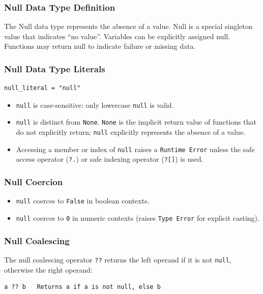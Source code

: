 \subsubsection{Null Data Type Definition}
The Null data type represents the absence of a value. Null is a special singleton value that indicates ``no value''. Variables can be explicitly assigned null. Functions may return null to indicate failure or missing data.

\subsubsection{Null Data Type Literals}
\begin{verbatim}
null_literal = "null"
\end{verbatim}

\begin{itemize}
\item \texttt{null} is case-sensitive: only lowercase \texttt{null} is valid.
\item \texttt{null} is distinct from \texttt{None}. \texttt{None} is the implicit return value of functions that do not explicitly return; \texttt{null} explicitly represents the absence of a value.
\item Accessing a member or index of \texttt{null} raises a \texttt{Runtime Error} unless the safe access operator (\texttt{?.}) or safe indexing operator (\texttt{?[]}) is used.
\end{itemize}

\subsubsection{Null Coercion}
\begin{itemize}
\item \texttt{null} coerces to \texttt{False} in boolean contexts.
\item \texttt{null} coerces to \texttt{0} in numeric contexts (raises \texttt{Type Error} for explicit casting).
\end{itemize}

\subsubsection{Null Coalescing}
The null coalescing operator \texttt{??} returns the left operand if it is not \texttt{null}, otherwise the right operand:
\begin{verbatim}
a ?? b   Returns a if a is not null, else b
\end{verbatim}


